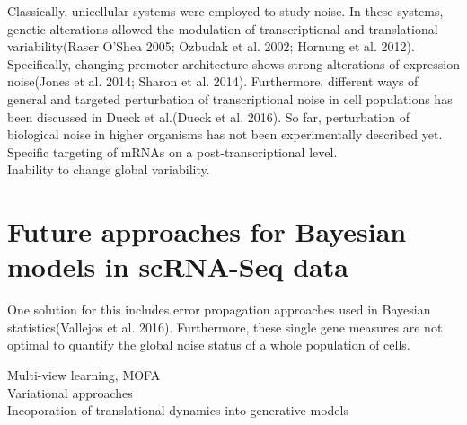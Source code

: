 Classically, unicellular systems were employed to study noise. In these systems, genetic alterations allowed the modulation of transcriptional and translational variability(Raser O’Shea 2005; Ozbudak et al. 2002; Hornung et al. 2012). Specifically, changing promoter architecture shows strong alterations of expression noise(Jones et al. 2014; Sharon et al. 2014). Furthermore, different ways of general and targeted perturbation of transcriptional noise in cell populations has been discussed in Dueck et al.(Dueck et al. 2016). So far, perturbation of biological noise in higher organisms has not been experimentally described yet.\\


Specific targeting of mRNAs on a post-transcriptional level.\\

Inability to change global variability. \\


\section{Future approaches for Bayesian models in scRNA-Seq data}

One solution for this includes error propagation approaches used in Bayesian statistics(Vallejos et al. 2016). Furthermore, these single gene measures are not optimal to quantify the global noise status of a whole population of cells.

Multi-view learning, MOFA\\
Variational approaches\\
Incoporation of translational dynamics into generative models

